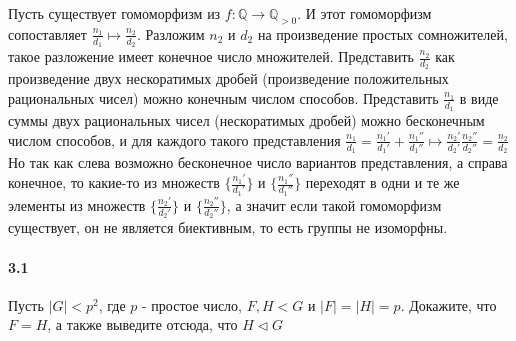 \documentclass[a4paper,12pt]{article}
\begin{document}
\begin{Solution}
Пусть существует гомоморфизм из $f:\mathbb{Q} \rightarrow \mathbb{Q}_{>0}$. И этот гомоморфизм сопоставляет $\frac{n_1}{d_1} \mapsto \frac{n_2}{d_2}$. Разложим $n_2$ и $d_2$ на произведение простых сомножителей, такое разложение имеет конечное число множителей. Представить $\frac{n_2}{d_2}$ как произведение двух нескоратимых дробей (произведение положительных рациональных чисел) можно конечным числом способов. Представить $\frac{n_1}{d_1}$ в виде суммы двух рациональных чисел (нескоратимых дробей) можно бесконечным числом способов, и для каждого такого представления $\frac{n_1}{d_1} = \frac{n_1'}{d_1'} + \frac{n_1''}{d_1''} \mapsto \frac{n_2'}{d_2'} \frac{n_2''}{d_2''} = \frac{n_2}{d_2}$ Но так как слева возможно бесконечное число вариантов представления, а справа конечное, то какие-то из множеств $\{\frac{n_1'}{d_1'}\}$ и $\{\frac{n_1''}{d_1''}\}$ переходят в одни и те же элементы из множеств $\{\frac{n_2'}{d_2'}\}$ и $\{\frac{n_2''}{d_2''}\}$, а значит если такой гомоморфизм существует, он не является биективным, то есть группы не изоморфны.
\end{Solution}

\paragraph{3.1} Пусть $|G| < p^2$, где $p$ - простое число, $F,H < G$ и $|F| = |H| = p$. Докажите, что $F = H$, а также выведите отсюда, что $H \vartriangleleft G$
\end{document}
